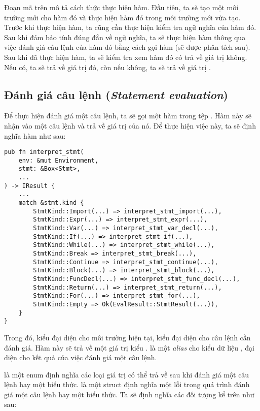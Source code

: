     Đoạn mã trên mô tả cách thức thực hiện hàm. Đầu tiên, ta sẽ tạo một môi trường mới cho hàm đó và thực hiện hàm đó trong môi trường mới vừa tạo. Trước khi thực hiện hàm, ta cũng cần thực hiện kiểm tra ngữ nghĩa của hàm đó. Sau khi đảm bảo tính đúng đắn về ngữ nghĩa, ta sẽ thực hiện hàm thông qua việc đánh giá câu lệnh của hàm đó bằng cách gọi hàm  (sẽ được phân tích sau). Sau khi đã thực hiện hàm, ta sẽ kiểm tra xem hàm đó có trả về giá trị không. Nếu có, ta sẽ trả về giá trị đó, còn nếu không, ta sẽ trả về giá trị . 

\subsection{Đánh giá câu lệnh (\textit{Statement evaluation})}

    Để thực hiện đánh giá một câu lệnh, ta sẽ gọi một hàm  trong tệp . Hàm này sẽ nhận vào một câu lệnh và trả về giá trị của nó. Để thực hiện việc này, ta sẽ định nghĩa hàm  như sau:

\begin{lstlisting}[]
pub fn interpret_stmt(
    env: &mut Environment,
    stmt: &Box<Stmt>,
    ...
) -> IResult {
    ...
    match &stmt.kind {
        StmtKind::Import(...) => interpret_stmt_import(...),
        StmtKind::Expr(...) => interpret_stmt_expr(...),
        StmtKind::Var(...) => interpret_stmt_var_decl(...),
        StmtKind::If(...) => interpret_stmt_if(...),
        StmtKind::While(...) => interpret_stmt_while(...),
        StmtKind::Break => interpret_stmt_break(...),
        StmtKind::Continue => interpret_stmt_continue(...),
        StmtKind::Block(...) => interpret_stmt_block(...),
        StmtKind::FuncDecl(...) => interpret_stmt_func_decl(...),
        StmtKind::Return(...) => interpret_stmt_return(...),
        StmtKind::For(...) => interpret_stmt_for(...),
        StmtKind::Empty => Ok(EvalResult::StmtResult(...)),
    }
}
\end{lstlisting}

    Trong đó,  kiểu  đại diện cho môi trường hiện tại,  kiểu  đại diện cho câu lệnh cần đánh giá. Hàm này sẽ trả về một giá trị kiểu .  là một \textit{alias} cho kiểu dữ liệu  \kw{>}, đại diện cho kết quả của việc đánh giá một câu lệnh. 

     là một enum định nghĩa các loại giá trị có thể trả về sau khi đánh giá một câu lệnh hay một biểu thức.  là một struct định nghĩa một lỗi trong quá trình đánh giá một câu lệnh hay một biểu thức. Ta sẽ định nghĩa các đối tượng kể trên như sau:

